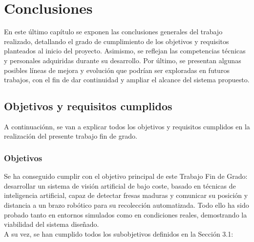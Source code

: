 \chapter{Conclusiones}
\label{cap:capitulo7}

En este último capítulo se exponen las conclusiones generales del trabajo realizado, detallando el grado de cumplimiento de los objetivos y requisitos planteados al inicio del proyecto. Asimismo, se reflejan las competencias técnicas y personales adquiridas durante su desarrollo. Por último, se presentan algunas posibles líneas de mejora y evolución que podrían ser exploradas en futuros trabajos, con el fin de dar continuidad y ampliar el alcance del sistema propuesto.

\section{Objetivos y requisitos cumplidos}
\label{sec:objetivos_y_requisitos}

A continuaciónn, se van a explicar todos los objetivos y requisitos cumplidos en la realización del presente trabajo fin de grado.

\subsection{Objetivos}
\label{subsec:objetivos}

Se ha conseguido cumplir con el objetivo principal de este Trabajo Fin de Grado: desarrollar un sistema de visión artificial de bajo coste, basado en técnicas de inteligencia artificial, capaz de detectar fresas maduras y comunicar su posición y distancia a un brazo robótico para su recolección automatizada. Todo ello ha sido probado tanto en entornos simulados como en condiciones reales, demostrando la viabilidad del sistema diseñado.\\

A su vez, se han cumplido todos los subobjetivos definidos en la Sección 3.1:

